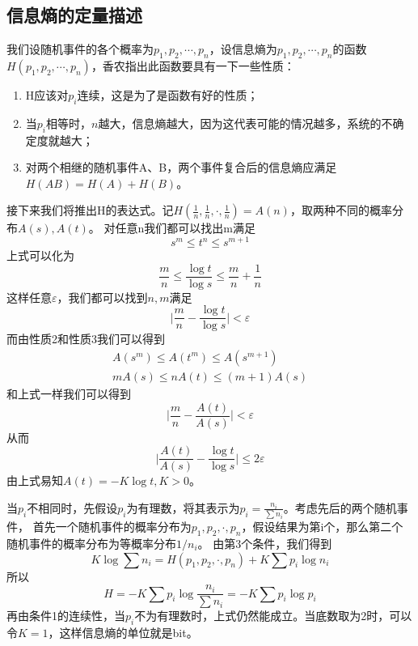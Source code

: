 \documentclass{ctexart}
\begin{document}
\subsection{信息熵的定量描述}
我们设随机事件的各个概率为$p_1,p_2,\cdots ,p_n$，设信息熵为$p_1,p_2,\cdots ,p_n$的函数$H(p_1,p_2,\cdots ,p_n)$，香农指出此函数要具有一下一些性质：
\begin{enumerate}
    \item H应该对$p_i$连续，这是为了是函数有好的性质；
    \item 当$p_i$相等时，$n$越大，信息熵越大，因为这代表可能的情况越多，系统的不确定度就越大；
    \item 对两个相继的随机事件A、B，两个事件复合后的信息熵应满足$H(AB)=H(A)+H(B)$。
\end{enumerate}
接下来我们将推出H的表达式。记$H(\frac{1}{n},\frac{1}{n},\cdot,\frac{1}{n})=A(n)$，取两种不同的概率分布$A(s),A(t)$。
对任意n我们都可以找出m满足
\begin{equation}
    s^m \leq t^n \leq s^{m+1}
\end{equation}
上式可以化为
\begin{equation}
    \frac{m}{n}\leq\frac{\log t}{\log s}\leq \frac{m}{n}+\frac{1}{n}
\end{equation}
这样任意$\varepsilon $，我们都可以找到$n,m$满足
\begin{equation}
    \vert \frac{m}{n}-\frac{\log t}{\log s}\vert<\varepsilon 
\end{equation}
而由性质2和性质3我们可以得到
\begin{align}
    A(s^m)\leq A(t^m)\leq A(s^{m+1})\\
    mA(s)\leq nA(t)\leq (m+1)A(s)
\end{align}
和上式一样我们可以得到
\begin{equation}
    \vert \frac{m}{n}-\frac{A(t)}{A(s)}\vert<\varepsilon 
\end{equation}
从而
\begin{equation}
    \vert \frac{A(t)}{A(s)}-\frac{\log t}{\log s}\vert\leq 2\varepsilon
\end{equation}
由上式易知$A(t)=-K\log t,K>0$。
\par
当$p_i$不相同时，先假设$p_i$为有理数，将其表示为$p_i=\frac{n_i}{\sum n_i}$。考虑先后的两个随机事件，
首先一个随机事件的概率分布为$p_1,p_2,\cdot,p_n$，假设结果为第i个，那么第二个随机事件的概率分布为等概率分布$1/n_i$。
由第3个条件，我们得到
\begin{equation}
    K\log \sum n_i = H(p_1,p_2,\cdot,p_n) + K\sum p_i\log n_i
\end{equation}
所以
\begin{equation}
    H=-K\sum p_i\log \frac{n_i}{\sum n_i}=-K \sum p_i \log p_i
\end{equation}
再由条件1的连续性，当$p_i$不为有理数时，上式仍然能成立。当底数取为2时，可以令$K=1$，这样信息熵的单位就是bit。
\end{document}
